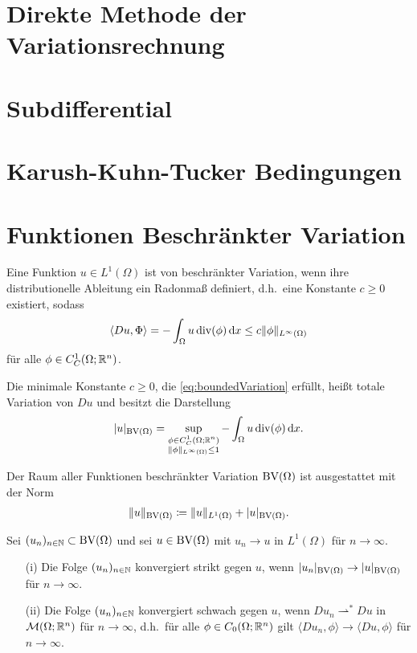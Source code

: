 \section{Direkte Methode der Variationsrechnung}
\section{Subdifferential}
\section{Karush-Kuhn-Tucker Bedingungen}


\section{Funktionen Beschränkter Variation}

\begin{definition}
  Eine Funktion $u\in L^1(\Omega)$ ist von beschränkter Variation, wenn ihre
  distributionelle Ableitung ein Radonmaß definiert, d.h.\ eine Konstante
  $c\geq 0$ existiert, sodass 
  \begin{align}
    \label{eq:boundedVariation}
    \langle Du,\Phi\rangle = - \int_\Omega u\operatorname{div} (\phi) \,\mathrm{d}x 
    \leq c\Vert\phi\Vert_{L^\infty(\Omega)}
  \end{align}
  für alle $\phi\in C^1_C(\Omega;\mathbb{R}^n)$.

  Die minimale Konstante $c\geq 0$, die \eqref{eq:boundedVariation} erfüllt,
  heißt totale Variation von $Du$ und besitzt die Darstellung
  \begin{align*}
    |u|_{\textup{BV}(\Omega)} = \sup_{\substack{\phi\in C^1_C(\Omega;\mathbb{R}^n)\\
    \Vert\phi\Vert_{L^\infty(\Omega)}\leq 1}}-\int_\Omega u\operatorname{div} (\phi)\,\mathrm{d}x.
  \end{align*}

  Der Raum aller Funktionen beschränkter Variation $\textup{BV}(\Omega)$
  ist ausgestattet mit der Norm 
  \begin{align*}
    \Vert u \Vert_{\textup{BV}(\Omega)} \coloneqq \Vert u\Vert_{L^1(\Omega)} +
    |u|_{\textup{BV}(\Omega)}.
  \end{align*}
\end{definition}

\begin{definition}
  Sei $(u_n)_{n\in\mathbb{N}}\subset \textup{BV}(\Omega)$ und sei $u\in \textup{BV}(\Omega)$ mit
  $u_n\rightarrow u$ in $L^1(\Omega)$ für $n\rightarrow\infty$.
  \begin{itemize}
    \item[(i)]
      Die Folge $(u_n)_{n\in\mathbb{N}}$ konvergiert strikt gegen $u$,
      wenn $|u_n|_{\textup{BV}(\Omega)}\rightarrow |u|_{\textup{BV}(\Omega)}$ für $n\rightarrow\infty$.
    \item[(ii)] Die Folge $(u_n)_{n\in\mathbb{N}}$ konvergiert
      schwach gegen $u$, wenn
      $Du_n\rightharpoonup^\ast Du$ in 
      $\mathcal{M}(\Omega;\mathbb{R}^n)$ für $n\rightarrow\infty$, d.h.\ für alle
      $\phi\in C_0(\Omega;\mathbb{R}^n)$ gilt 
      $\langle Du_n,\phi\rangle\rightarrow \langle Du,\phi\rangle$ für 
      $n\rightarrow\infty$.
  \end{itemize}
\end{definition}

